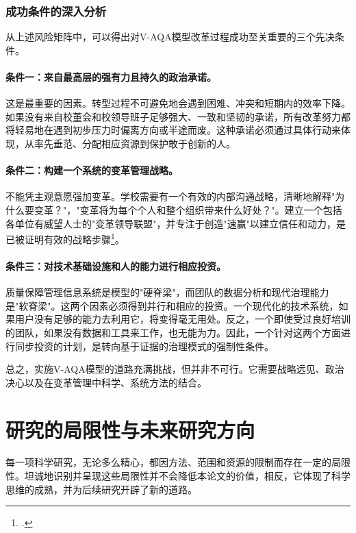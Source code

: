 \subsubsection{成功条件的深入分析}

从上述风险矩阵中，可以得出对V-AQA模型改革过程成功至关重要的三个先决条件。

\paragraph{条件一：来自最高层的强有力且持久的政治承诺。}
这是最重要的因素。转型过程不可避免地会遇到困难、冲突和短期内的效率下降。如果没有来自校董会和校领导班子足够强大、一致和坚韧的承诺，所有改革努力都将轻易地在遇到初步压力时偏离方向或半途而废。这种承诺必须通过具体行动来体现，从率先垂范、分配相应资源到保护敢于创新的人。

\paragraph{条件二：构建一个系统的变革管理战略。}
不能凭主观意愿强加变革。学校需要有一个有效的内部沟通战略，清晰地解释"为什么要变革？"，"变革将为每个个人和整个组织带来什么好处？"。建立一个包括各单位有威望人士的"变革领导联盟"，并专注于创造"速赢"以建立信任和动力，是已被证明有效的战略步骤\footcite{kotter_1996}。

\paragraph{条件三：对技术基础设施和人的能力进行相应投资。}
质量保障管理信息系统是模型的"硬脊梁"，而团队的数据分析和现代治理能力是"软脊梁"。这两个因素必须得到并行和相应的投资。一个现代化的技术系统，如果用户没有足够的能力去利用它，将变得毫无用处。反之，一个即使受过良好培训的团队，如果没有数据和工具来工作，也无能为力。因此，一个针对这两个方面进行同步投资的计划，是转向基于证据的治理模式的强制性条件。

总之，实施V-AQA模型的道路充满挑战，但并非不可行。它需要战略远见、政治决心以及在变革管理中科学、系统方法的结合。





\section{研究的局限性与未来研究方向}
\label{sec:hanche_huongnghiencuu}

每一项科学研究，无论多么精心，都因方法、范围和资源的限制而存在一定的局限性。坦诚地识别并呈现这些局限性并不会降低本论文的价值，相反，它体现了科学思维的成熟，并为后续研究开辟了新的道路。

